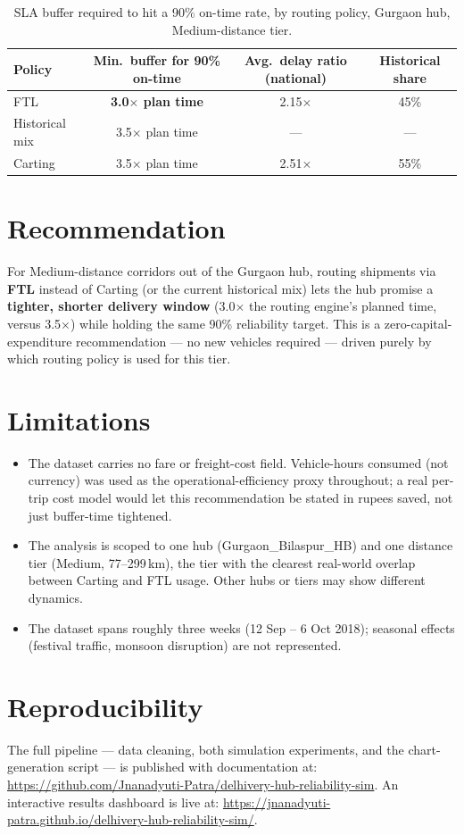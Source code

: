 \documentclass[10.5pt,a4paper]{article}
\begin{document}
\begin{table}[h!]
\centering
\begin{tabular}{@{}lccc@{}}
\toprule
\textbf{Policy} & \textbf{Min.\ buffer for 90\% on-time} & \textbf{Avg.\ delay ratio (national)} & \textbf{Historical share} \\
\midrule
FTL             & \textbf{3.0$\times$ plan time} & 2.15$\times$ & 45\% \\
Historical mix  & 3.5$\times$ plan time & --- & --- \\
Carting         & 3.5$\times$ plan time & 2.51$\times$ & 55\% \\
\bottomrule
\end{tabular}
\caption{SLA buffer required to hit a 90\% on-time rate, by routing policy, Gurgaon hub, Medium-distance tier.}
\end{table}

\section{Recommendation}

For Medium-distance corridors out of the Gurgaon hub, routing shipments via \textbf{FTL} instead of Carting (or the current historical mix) lets the hub promise a \textbf{tighter, shorter delivery window} (3.0$\times$ the routing engine's planned time, versus 3.5$\times$) while holding the same 90\% reliability target. This is a zero-capital-expenditure recommendation --- no new vehicles required --- driven purely by which routing policy is used for this tier.

\section{Limitations}

\begin{itemize}[leftmargin=1.4em]
  \item The dataset carries no fare or freight-cost field. Vehicle-hours consumed (not currency) was used as the operational-efficiency proxy throughout; a real per-trip cost model would let this recommendation be stated in rupees saved, not just buffer-time tightened.
  \item The analysis is scoped to one hub (Gurgaon\_Bilaspur\_HB) and one distance tier (Medium, 77--299\,km), the tier with the clearest real-world overlap between Carting and FTL usage. Other hubs or tiers may show different dynamics.
  \item The dataset spans roughly three weeks (12 Sep -- 6 Oct 2018); seasonal effects (festival traffic, monsoon disruption) are not represented.
\end{itemize}

\section{Reproducibility}

The full pipeline --- data cleaning, both simulation experiments, and the chart-generation script --- is published with documentation at:
\url{https://github.com/Jnanadyuti-Patra/delhivery-hub-reliability-sim}. An interactive results dashboard is live at:
\url{https://jnanadyuti-patra.github.io/delhivery-hub-reliability-sim/}.
\end{document}
